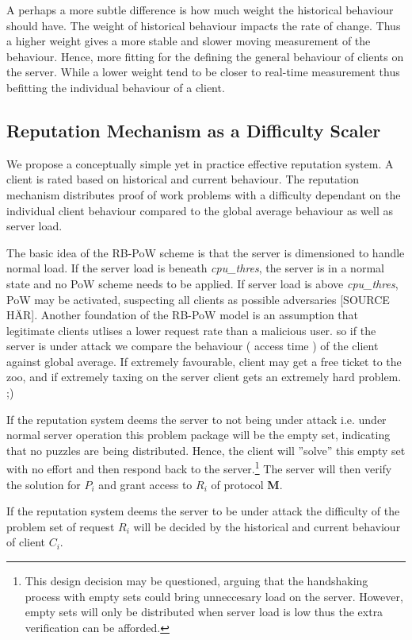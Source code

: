 A perhaps a more subtle difference is how much weight the historical behaviour should have. The weight of historical behaviour impacts the rate of change. Thus a higher weight gives a more stable and slower moving measurement of the behaviour. Hence, more fitting for the defining the general behaviour of clients on the server. While a lower weight tend to be closer to real-time measurement thus befitting the individual behaviour of a client.

\subsection{Reputation Mechanism as a Difficulty Scaler}\label{text:diffscaler}
We propose a conceptually simple yet in practice effective reputation system. A client is rated based on historical and current behaviour. The reputation mechanism distributes proof of work problems with a difficulty dependant on the individual client behaviour compared to the global average behaviour as well as server load. 

The basic idea of the RB-PoW scheme is that the server is dimensioned to handle normal load. If the server load is beneath \emph{cpu\_thres}, the server is in a normal state and no PoW scheme needs to be applied. If server load is above {\em cpu\_thres}, PoW may be activated, suspecting all clients as possible adversaries [SOURCE HÄR]. Another foundation of the RB-PoW model is an assumption that legitimate clients utlises a lower request rate than a malicious user. so if the server is under attack we compare the behaviour ( access time ) of the client against global average. If extremely favourable, client may get a free ticket to the zoo, and if extremely taxing on the server client gets an extremely hard problem.  ;)


If the reputation system deems the server to not being under attack i.e. under normal server operation this problem package will be the empty set, indicating that no puzzles are being distributed.
Hence, the client will ''solve'' this empty set with no effort and then respond back to the server.\footnote{This design decision may be questioned, arguing that the handshaking process with empty sets could bring unneccesary load on the server.
However, empty sets will only be distributed when server load is low thus the extra verification can be afforded.}
The server will then verify the solution for $P_i$ and grant access to $R_i$ of protocol \textbf{M}.

If the reputation system deems the server to be under attack the difficulty of the problem set of request $R_i$ will be decided by the historical and current behaviour of client $C_i$. 


